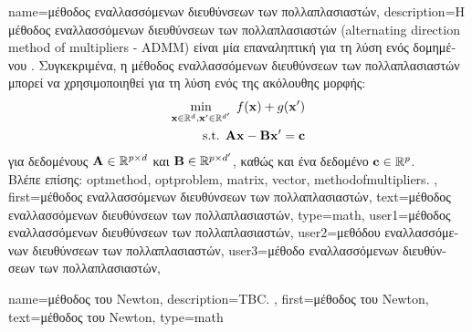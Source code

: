 {name={\foreignlanguage{greek}{μέθοδος εναλλασσόμενων διευθύνσεων των πολλαπλασιαστών}},
	description={\foreignlanguage{greek}{Η μέθοδος εναλλασσόμενων διευθύνσεων των 
		πολλαπλασιαστών} 
		(alternating direction method of multipliers - ADMM) \foreignlanguage{greek}{είναι μία επαναληπτική} 
		 \foreignlanguage{greek}{για τη λύση ενός δομημένου} . 
		\foreignlanguage{greek}{Συγκεκριμένα, η μέθοδος εναλλασσόμενων διευθύνσεων των πολλαπλασιαστών 
		μπορεί να χρησιμοποιηθεί για τη λύση ενός}  \foreignlanguage{greek}{της ακόλουθης μορφής}: 
		\begin{align}
			\min_{\featurevec \in \mathbb{R}^{\nrfeatures},\featurevec' \in \mathbb{R}^{\nrfeatures'}} \; f(\featurevec) 
			+ g(\featurevec') \nonumber \\ 
			\mbox{ s.t. } \mA \featurevec - \mB \featurevec' = \vc \nonumber
		\end{align}
		\foreignlanguage{greek}{για δεδομένους}  ${\bf A} \in \mathbb{R}^{p \times d}$ 
		\foreignlanguage{greek}{και} ${\bf B} \in \mathbb{R}^{p \times d'}$,
		\foreignlanguage{greek}{καθώς και ένα δεδομένο}  ${\bf c} \in \mathbb{R}^p$.
		\\
		\foreignlanguage{greek}{Βλέπε επίσης:} \gls{optmethod}, \gls{optproblem}, \gls{matrix}, \gls{vector}, \gls{methodofmultipliers}. }, 
	first={\foreignlanguage{greek}{μέθοδος εναλλασσόμενων διευθύνσεων των πολλαπλασιαστών}},
	text={\foreignlanguage{greek}{μέθοδος εναλλασσόμενων διευθύνσεων των πολλαπλασιαστών}},
	type=math,
	user1={\foreignlanguage{greek}{μέθοδος εναλλασσόμενων διευθύνσεων των πολλαπλασιαστών}}, %
  	user2={\foreignlanguage{greek}{μεθόδου εναλλασσόμενων διευθύνσεων των πολλαπλασιαστών}}, %
	user3={\foreignlanguage{greek}{μέθοδο εναλλασσόμενων διευθύνσεων των πολλαπλασιαστών}}, %
}%

{name={\foreignlanguage{greek}{μέθοδος του} Newton},
	description={TBC. },
  	first={\foreignlanguage{greek}{μέθοδος του} Newton},
  	text={\foreignlanguage{greek}{μέθοδος του} Newton},
	type=math
}

